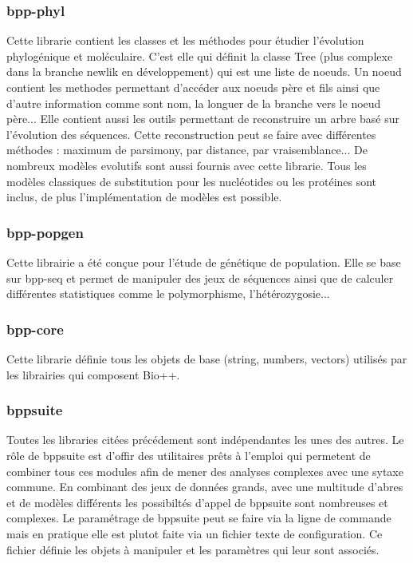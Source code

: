 	\subsubsection*{bpp-phyl}
	Cette librarie contient les classes et les méthodes pour étudier l'évolution phylogénique et moléculaire. C'est elle qui définit la classe Tree (plus complexe dans la branche newlik en développement) qui est une liste de noeuds. Un noeud contient les methodes permettant d'accéder aux noeuds père et fils ainsi que d'autre information comme sont nom, la longuer de la branche vers le noeud père...
	Elle contient aussi les outils permettant de reconstruire un arbre basé sur l'évolution des séquences. Cette reconstruction peut se faire avec différentes méthodes : maximum de parsimony, par distance, par vraisemblance...
	De nombreux modèles evolutifs sont aussi fournis avec cette librarie. Tous les modèles classiques de substitution pour les nucléotides ou les protéines sont inclus, de plus l'implémentation de modèles est possible.
	\subsubsection*{bpp-popgen}
	Cette librairie a été conçue pour l'étude de génétique de population. Elle se base sur bpp-seq et permet de manipuler des jeux de séquences ainsi que de calculer différentes statistiques comme le polymorphisme, l'hétérozygosie...
	
	\subsubsection*{bpp-core}
	Cette librarie définie tous les objets de base (string, numbers, vectors) utilisés par les librairies qui composent Bio++.
	
	\subsubsection*{bppsuite}
	Toutes les libraries citées précédement sont indépendantes les unes des autres. Le rôle de bppsuite est d'offir des utilitaires prêts à l'emploi qui permetent de combiner tous ces modules afin de mener des analyses complexes avec une sytaxe commune. En combinant des jeux de données grands, avec une multitude d'abres et de modèles différents les possibiltés d'appel de bppsuite sont nombreuses et complexes. Le paramétrage de bppsuite peut se faire via la ligne de commande mais en pratique elle est plutot faite via un fichier texte de configuration. Ce fichier définie les objets à manipuler et les paramètres qui leur sont associés.
	
